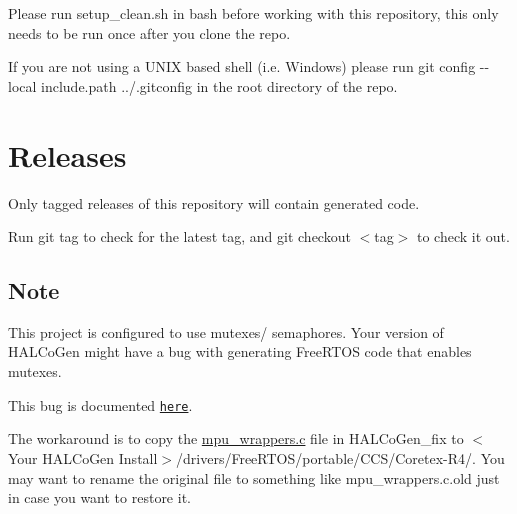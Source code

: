 Please run {\ttfamily setup\+\_\+clean.\+sh} in bash before working with this repository, this only needs to be run once after you clone the repo.

If you are not using a U\+N\+IX based shell (i.\+e. Windows) please run {\ttfamily git config -\/-\/local include.\+path ../.gitconfig} in the root directory of the repo.

\section*{Releases}

Only tagged releases of this repository will contain generated code.

Run {\ttfamily git tag} to check for the latest tag, and {\ttfamily git checkout $<$tag$>$} to check it out.

\subsection*{Note}

This project is configured to use mutexes/ semaphores. Your version of H\+A\+L\+Co\+Gen might have a bug with generating Free\+R\+T\+OS code that enables mutexes.

This bug is documented \href{http://e2e.ti.com/support/microcontrollers/hercules/f/312/p/626490/2320355}{\tt here}.

The workaround is to copy the {\ttfamily \mbox{\hyperlink{mpu__wrappers_8c_source}{mpu\+\_\+wrappers.\+c}}} file in {\ttfamily H\+A\+L\+Co\+Gen\+\_\+fix} to {\ttfamily $<$Your H\+A\+L\+Co\+Gen Install$>$/drivers/\+Free\+R\+T\+O\+S/portable/\+C\+C\+S/\+Coretex-\/\+R4/}. You may want to rename the original file to something like {\ttfamily mpu\+\_\+wrappers.\+c.\+old} just in case you want to restore it. 